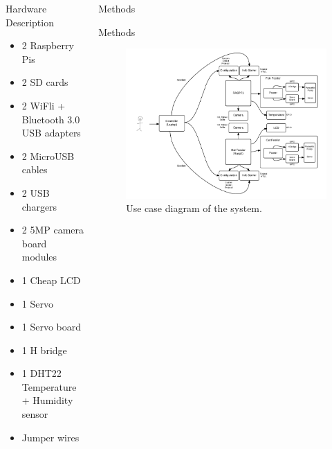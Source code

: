 \documentclass[final]{beamer}
\newlength{\onecolwid}
\newlength{\twocolwid}
\begin{document}
\begin{frame}[t]
\begin{columns}[t]
\begin{column}{\twocolwid}
\begin{columns}[t,totalwidth=\twocolwid]
\begin{column}{\onecolwid}
\begin{block}{Hardware Description}
\begin{itemize}
\item 2 Raspberry Pis
\item 2 SD cards
\item 2 WiFli + Bluetooth 3.0 USB adapters
\item 2 MicroUSB cables
\item 2 USB chargers
\item 2 5MP camera board modules
\item 1 Cheap LCD
\item 1 Servo
\item 1 Servo board
\item 1 H bridge
\item 1 DHT22 Temperature + Humidity sensor
\item Jumper wires
\end{itemize}

\end{block}


\end{column} %

\begin{column}{\onecolwid}\vspace{-.6in} %


\begin{block}{Methods}

    Methods

\end{block}

\begin{figure}
\includegraphics[width=1\linewidth]{UseCaseDiagram}
\caption{Use case diagram of the system.}
\end{figure}



\end{column}
\end{columns}
\end{column}
\end{columns}
\end{frame}
\end{document}
